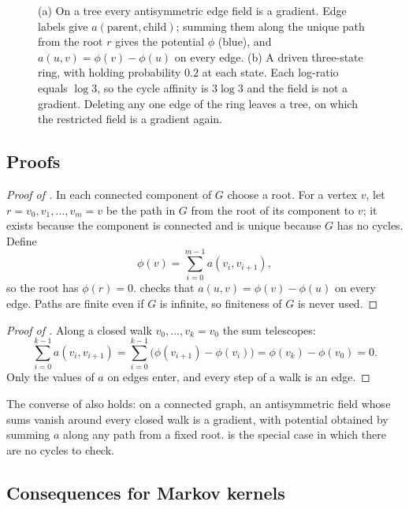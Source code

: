 \begin{figure}[t]
\caption{(a) On a tree every antisymmetric edge field is a gradient. Edge labels give $a(\text{parent},\text{child})$; summing them along the unique path from the root $r$ gives the potential $\phi$ (blue), and $a(u,v)=\phi(v)-\phi(u)$ on every edge. (b) A driven three-state ring, with holding probability $0.2$ at each state. Each log-ratio equals $\log 3$, so the cycle affinity is $3\log 3$ and the field is not a gradient. Deleting any one edge of the ring leaves a tree, on which the restricted field is a gradient again.}\label{fig:forest_cycle}
\end{figure}

\subsection{Proofs}

\begin{proof}[Proof of ]
In each connected component of $G$ choose a root.
For a vertex $v$, let $r=v_0,v_1,\dots,v_m=v$ be the path in $G$ from the root of its component to $v$; it exists because the component is connected and is unique because $G$ has no cycles.
Define
\[
  \phi(v)=\sum_{i=0}^{m-1}a(v_i,v_{i+1}),
\]
so the root has $\phi(r)=0$.
 checks that $a(u,v)=\phi(v)-\phi(u)$ on every edge.
Paths are finite even if $G$ is infinite, so finiteness of $G$ is never used.
\end{proof}

\begin{proof}[Proof of ]
Along a closed walk $v_0,\dots,v_k=v_0$ the sum telescopes:
\[
  \sum_{i=0}^{k-1}a(v_i,v_{i+1})=\sum_{i=0}^{k-1}\bigl(\phi(v_{i+1})-\phi(v_i)\bigr)=\phi(v_k)-\phi(v_0)=0.
\]
Only the values of $a$ on edges enter, and every step of a walk is an edge.
\end{proof}

The converse of \thmNGForceNull{} also holds: on a connected graph, an antisymmetric field whose sums vanish around every closed walk is a gradient, with potential obtained by summing $a$ along any path from a fixed root.
\thmNGForceForest{} is the special case in which there are no cycles to check.

\subsection{Consequences for Markov kernels}

